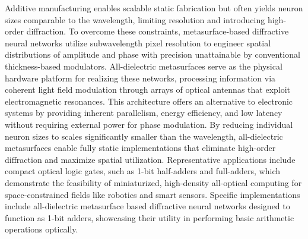 Additive manufacturing enables scalable static fabrication but often yields neuron sizes comparable to the wavelength, limiting resolution and introducing high-order diffraction. To overcome these constraints, metasurface-based diffractive neural networks utilize subwavelength pixel resolution to engineer spatial distributions of amplitude and phase with precision unattainable by conventional thickness-based modulators. All-dielectric metasurfaces serve as the physical hardware platform for realizing these networks, processing information via coherent light field modulation through arrays of optical antennas that exploit electromagnetic resonances. This architecture offers an alternative to electronic systems by providing inherent parallelism, energy efficiency, and low latency without requiring external power for phase modulation. By reducing individual neuron sizes to scales significantly smaller than the wavelength, all-dielectric metasurfaces enable fully static implementations that eliminate high-order diffraction and maximize spatial utilization. Representative applications include compact optical logic gates, such as 1-bit half-adders and full-adders, which demonstrate the feasibility of miniaturized, high-density all-optical computing for space-constrained fields like robotics and smart sensors. Specific implementations include all-dielectric metasurface based diffractive neural networks designed to function as 1-bit adders, showcasing their utility in performing basic arithmetic operations optically. \citep{doi_10_1515_nanoph_2023_0760_2c3ec088} \citep{doi_10_3390_nano14221812_4d7d91b1} \citep{doi_10_1515_nanoph_2023_0760_2c3ec088} \citep{doi_10_1117_12_2688132_926a2697}

